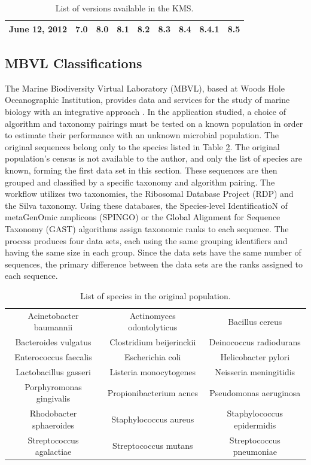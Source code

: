 \begin{table}
	\caption{List of versions available in the KMS.}
	\label{gcmd_table}
	\centering
	\begin{tabular}{|c|c|c|c|c|c|c|c|c|}
		\hline
		June 12, 2012 & 7.0 & 8.0 & 8.1 & 8.2 & 8.3 & 8.4 & 8.4.1 & 8.5 \\
		\hline
	\end{tabular}
\end{table}

\subsection{MBVL Classifications} \label{sec:MBVL}

The Marine Biodiversity Virtual Laboratory (MBVL), based at Woods Hole Oceanographic Institution, provides data and services for the study of marine biology with an integrative approach \cite{mbvl}.
In the application studied, a choice of algorithm and taxonomy pairings must be tested on a known population in order to estimate their performance with an unknown microbial population.
The original sequences belong only to the species listed in Table \ref{species_table}.
The original population's census is not available to the author, and only the list of species are known, forming the first data set in this section.
These sequences are then grouped and classified by a specific taxonomy and algorithm pairing.
The workflow utilizes two taxonomies, the Ribosomal Database Project (RDP) and the Silva taxonomy.
Using these databases, the Species-level IdentificatioN of metaGenOmic amplicons (SPINGO) or the Global Alignment for Sequence Taxonomy (GAST) algorithms assign taxonomic ranks to each sequence.
The process produces four data sets, each using the same grouping identifiers and having the same size in each group.
Since the data sets have the same number of sequences, the primary difference between the data sets are the ranks assigned to each sequence.

\begin{table}
	\caption{List of species in the original population.}
	\label{species_table}
	\centering
	\setlength{\tabcolsep}{2pt}
	\begin{tabular}{|c|c|c|}
		\hline
		Acinetobacter baumannii & Actinomyces odontolyticus & Bacillus cereus \\
		Bacteroides vulgatus & Clostridium beijerinckii & Deinococcus radiodurans \\
		Enterococcus faecalis & Escherichia coli & Helicobacter pylori \\
		Lactobacillus gasseri & Listeria monocytogenes & Neisseria meningitidis\\
		Porphyromonas gingivalis & Propionibacterium acnes & Pseudomonas aeruginosa \\
		Rhodobacter sphaeroides & Staphylococcus aureus & Staphylococcus epidermidis\\
		Streptococcus agalactiae & Streptococcus mutans & Streptococcus pneumoniae \\
		\hline
	\end{tabular}
\end{table}

